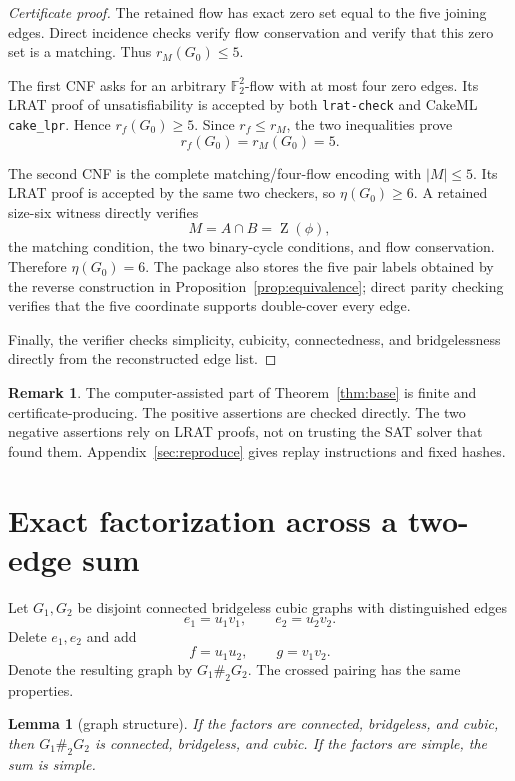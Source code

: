 \documentclass[11pt]{article}
\newtheorem{lemma}[theorem]{Lemma}
\theoremstyle{definition}
\newtheorem{remark}[theorem]{Remark}
\newcommand{\F}{\mathbb F}
\newcommand{\Zer}{\operatorname{Z}}
\newcommand{\etaext}{\eta}
\begin{document}
\begin{proof}[Certificate proof]
The retained flow has exact zero set equal to the five joining edges.
Direct incidence checks verify flow conservation and verify that this zero
set is a matching.  Thus \(r_M(G_0)\le5\).

The first CNF asks for an arbitrary \(\F_2^2\)-flow with at most four
zero edges.  Its LRAT proof of unsatisfiability is accepted by both
\texttt{lrat-check} and CakeML \texttt{cake\_lpr}.  Hence
\(r_f(G_0)\ge5\).  Since \(r_f\le r_M\), the two inequalities prove
\[
 r_f(G_0)=r_M(G_0)=5.
\]

The second CNF is the complete matching/four-flow encoding with
\(|M|\le5\).  Its LRAT proof is accepted by the same two checkers, so
\(\etaext(G_0)\ge6\).  A retained size-six witness directly verifies
\[
 M=A\cap B=\Zer(\phi),
\]
the matching condition, the two binary-cycle conditions, and flow
conservation.  Therefore \(\etaext(G_0)=6\).  The package also stores the
five pair labels obtained by the reverse construction in
Proposition~\ref{prop:equivalence}; direct parity checking verifies that
the five coordinate supports double-cover every edge.

Finally, the verifier checks simplicity, cubicity, connectedness, and
bridgelessness directly from the reconstructed edge list.
\end{proof}

\begin{remark}
The computer-assisted part of Theorem~\ref{thm:base} is finite and
certificate-producing.  The positive assertions are checked directly.
The two negative assertions rely on LRAT proofs, not on trusting the SAT
solver that found them.  Appendix~\ref{sec:reproduce} gives replay
instructions and fixed hashes.
\end{remark}

\section{Exact factorization across a two-edge sum}

Let \(G_1,G_2\) be disjoint connected bridgeless cubic graphs with
distinguished edges
\[
 e_1=u_1v_1,\qquad e_2=u_2v_2.
\]
Delete \(e_1,e_2\) and add
\[
 f=u_1u_2,\qquad g=v_1v_2.
\]
Denote the resulting graph by \(G_1\#_2G_2\).  The crossed pairing has the
same properties.

\begin{lemma}[graph structure]
\label{lem:structure}
If the factors are connected, bridgeless, and cubic, then
\(G_1\#_2G_2\) is connected, bridgeless, and cubic.  If the factors are
simple, the sum is simple.
\end{lemma}
\end{document}
